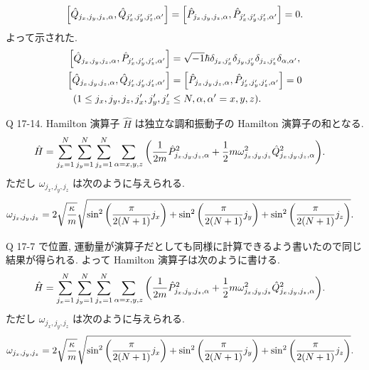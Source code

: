 \documentclass[uplatex,dvipdfmx,a4paper,11pt]{jlreq}
\theoremstyle{definition}
\begin{document}
\begin{align}
  \qty[\hat{Q}_{j_x,j_y,j_z,\alpha}, \hat{Q}_{j_x',j_y',j_z',\alpha'}] = \qty[\hat{P}_{j_x,j_y,j_z,\alpha}, \hat{P}_{j_x',j_y',j_z',\alpha'}] = 0.
\end{align}
よって示された.
\begin{align}
  \qty[\hat{Q}_{j_x,j_y,j_z,\alpha}, \hat{P}_{j_x',j_y',j_z',\alpha'}] & = \sqrt{-1}\hbar\delta_{j_x,j_x'}\delta_{j_y,j_y'}\delta_{j_z,j_z'}\delta_{\alpha,\alpha'}, \\
  \qty[\hat{Q}_{j_x,j_y,j_z,\alpha}, \hat{Q}_{j_x',j_y',j_z',\alpha'}] & = \qty[\hat{P}_{j_x,j_y,j_z,\alpha}, \hat{P}_{j_x',j_y',j_z',\alpha'}] = 0                  \\
  (1\leq j_x,j_y,j_z,j_x',j_y',j_z'                                    & \leq N, \alpha,\alpha' = x,y,z).
\end{align}

\begin{itembox}[l]{Q 17-14.}
  Hamilton 演算子 $\hat{H}$ は独立な調和振動子の Hamilton 演算子の和となる.
  \begin{align}
    \hat{H} & = \sum_{j_x=1}^{N}\sum_{j_y=1}^{N}\sum_{j_z=1}^{N}\sum_{\alpha=x,y,z}\qty(\frac{1}{2m}\hat{P}_{j_x,j_y,j_z,\alpha}^2 + \frac{1}{2}m\omega_{j_x,j_y,j_z}^2\hat{Q}_{j_x,j_y,j_z,\alpha}^2).
  \end{align}
  ただし $\omega_{j_x,j_y,j_z}$ は次のように与えられる.
  \begin{align}
    \omega_{j_x,j_y,j_z} & = 2\sqrt{\frac{\kappa}{m}}\sqrt{\sin^2\qty(\frac{\pi}{2(N+1)}j_x) + \sin^2\qty(\frac{\pi}{2(N+1)}j_y) + \sin^2\qty(\frac{\pi}{2(N+1)}j_z)}.
  \end{align}
\end{itembox}
Q 17-7 で位置, 運動量が演算子だとしても同様に計算できるよう書いたので同じ結果が得られる. よって Hamilton 演算子は次のように書ける.
\begin{align}
  \hat{H} & = \sum_{j_x=1}^{N}\sum_{j_y=1}^{N}\sum_{j_z=1}^{N}\sum_{\alpha=x,y,z}\qty(\frac{1}{2m}\hat{P}_{j_x,j_y,j_z,\alpha}^2 + \frac{1}{2}m\omega_{j_x,j_y,j_z}^2\hat{Q}_{j_x,j_y,j_z,\alpha}^2).
\end{align}
ただし $\omega_{j_x,j_y,j_z}$ は次のように与えられる.
\begin{align}
  \omega_{j_x,j_y,j_z} & = 2\sqrt{\frac{\kappa}{m}}\sqrt{\sin^2\qty(\frac{\pi}{2(N+1)}j_x) + \sin^2\qty(\frac{\pi}{2(N+1)}j_y) + \sin^2\qty(\frac{\pi}{2(N+1)}j_z)}.
\end{align}
\end{document}
